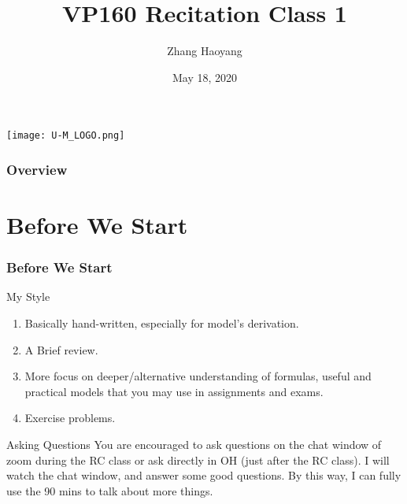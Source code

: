 \documentclass{beamer}
\title[RC1]{VP160 Recitation Class 1} %
\author{Zhang Haoyang} %
\institute[UM-SJTU Joint institute] %
{
    UM-SJTU Joint institute \\ %
\medskip 
\textit{zhy-sjtu-jc@sjtu.edu.cn} %
}
\date{May 18, 2020} %
\begin{document}
\begin{frame}
    \texttt{[image: U-M\_LOGO.png]}
\titlepage %
\end{frame}

\begin{frame}
\frametitle{Overview} %
\tableofcontents %
\end{frame}


\section{Before We Start} %
\begin{frame}
    \frametitle{Before We Start}
    \begin{block}{My Style}
    \begin{enumerate}
        \item Basically hand-written, especially for model's derivation.
        \item A Brief review.
        \item More focus on deeper/alternative understanding of formulas, useful and practical models that you may use in assignments and exams.
        \item Exercise problems. 
    \end{enumerate}
    \end{block}
    
    \begin{block}{Asking Questions}
    You are encouraged to ask questions on the chat window of zoom during the RC class or ask directly in OH (just after the RC class). 
    I will watch the chat window, and answer some good questions. By this way, I can fully use the 90 mins to talk about more things. 
    \end{block}

    \end{frame}
\end{document}
